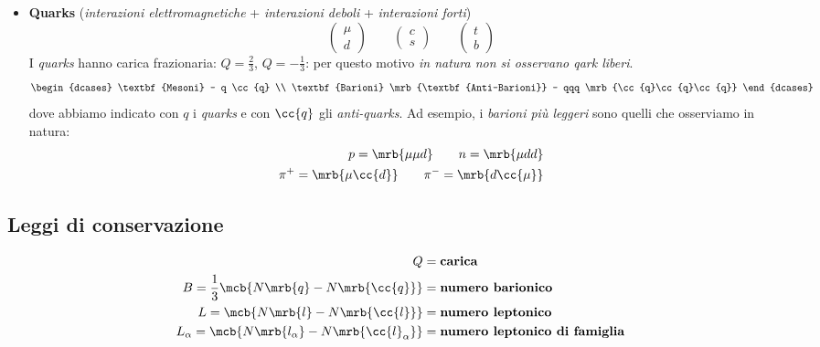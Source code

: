 \begin{itemize}
	\item \textbf{Quarks} (\textit{interazioni elettromagnetiche} +
	      \textit{interazioni deboli} + \textit{interazioni forti})
	      \begin{equation}
		      \begin{pmatrix}
			      \mu \\ d
		      \end{pmatrix}
		      \qquad
		      \begin{pmatrix}
			      c \\ s
		      \end{pmatrix}
		      \qquad
		      \begin{pmatrix}
			      t \\ b
		      \end{pmatrix}
	      \end{equation}
	      I \textit{quarks} hanno carica frazionaria: $Q = \frac{2}{3}$, $Q = -
		      \frac{1}{3}$: per questo motivo \textit{in natura non si osservano qark
		      liberi}.
	      \begin{equation}
		      \begin{dcases}
			      \textbf{Mesoni} - q \cc{q}
			      \\
			      \textbf{Barioni} \mrb{\textbf{Anti-Barioni}} - qqq
			      \mrb{\cc{q}\cc{q}\cc{q}}
		      \end{dcases}
	      \end{equation}
	      dove abbiamo indicato con $q$ i \textit{quarks} e con $\cc{q}$ gli
	      \textit{anti-quarks}. Ad esempio, i \textit{barioni più leggeri} sono
	      quelli che osserviamo in natura:
	      \begin{align*}
		      p = \mrb{\mu \mu d} \qquad n = \mrb{\mu dd}
		      \\
		      \pi^+ = \mrb{\mu \cc{d}} \qquad \pi^- = \mrb{d \cc{\mu}}
	      \end{align*}
\end{itemize}

\subsection{Leggi di conservazione}
\begin{align*}
	Q                                                                 & = \textbf{carica}
	\\
	B = \frac{1}{3} \mcb{N \mrb{q} - N \mrb{\cc{q}}}                  & = \textbf{numero barionico}
	\\
	L = \mcb{N \mrb{l} - N \mrb{\cc{l}}}                              & = \textbf{numero leptonico}
	\\
	L _{\alpha} = \mcb{N \mrb{l _{\alpha}} - N \mrb{\cc{l}_{\alpha}}} & =
	\textbf{numero leptonico di famiglia}
\end{align*}

